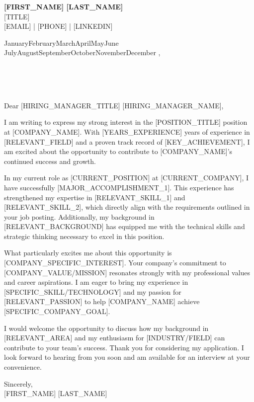 \documentclass[11pt,a4paper]{letter}
\newcommand{\cvheader}[6]{
    \begin{center}
        {\Large\bfseries\color{darkblue}#1 #2}\\[0.3em]
        {\color{lightgray}#3}\\[0.2em]
        {\small #4 | #5 | #6}
    \end{center}
    \vspace{1em}
}
\renewcommand{\today}{\ifcase\month\or
  January\or February\or March\or April\or May\or June\or
  July\or August\or September\or October\or November\or December\fi
  \space\number\day, \number\year}
\begin{document}
\cvheader{[FIRST_NAME]}{[LAST_NAME]}{[TITLE]}{[EMAIL]}{[PHONE]}{[LINKEDIN]}

\vspace{1em}
\today

\vspace{1.5em}
\begin{flushleft}
\\
[COMPANY_NAME]\\
[COMPANY_ADDRESS]\\
[CITY_STATE_ZIP]
\end{flushleft}

\vspace{1em}
Dear [HIRING_MANAGER_TITLE] [HIRING_MANAGER_NAME],

\vspace{1em}
I am writing to express my strong interest in the [POSITION_TITLE] position at [COMPANY_NAME]. With [YEARS_EXPERIENCE] years of experience in [RELEVANT_FIELD] and a proven track record of [KEY_ACHIEVEMENT], I am excited about the opportunity to contribute to [COMPANY_NAME]'s continued success and growth.

\vspace{1em}
In my current role as [CURRENT_POSITION] at [CURRENT_COMPANY], I have successfully [MAJOR_ACCOMPLISHMENT_1]. This experience has strengthened my expertise in [RELEVANT_SKILL_1] and [RELEVANT_SKILL_2], which directly align with the requirements outlined in your job posting. Additionally, my background in [RELEVANT_BACKGROUND] has equipped me with the technical skills and strategic thinking necessary to excel in this position.

\vspace{1em}
What particularly excites me about this opportunity is [COMPANY_SPECIFIC_INTEREST]. Your company's commitment to [COMPANY_VALUE/MISSION] resonates strongly with my professional values and career aspirations. I am eager to bring my experience in [SPECIFIC_SKILL/TECHNOLOGY] and my passion for [RELEVANT_PASSION] to help [COMPANY_NAME] achieve [SPECIFIC_COMPANY_GOAL].

\vspace{1em}
I would welcome the opportunity to discuss how my background in [RELEVANT_AREA] and my enthusiasm for [INDUSTRY/FIELD] can contribute to your team's success. Thank you for considering my application. I look forward to hearing from you soon and am available for an interview at your convenience.

\vspace{1.5em}
\begin{flushleft}
Sincerely,\\
\vspace{2em}
[FIRST_NAME] [LAST_NAME]
\end{flushleft}
\end{document}
